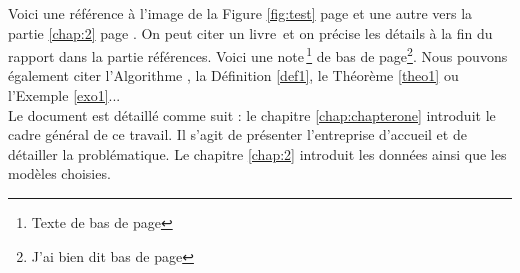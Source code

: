 


%
%


Voici une référence à l'image de la Figure \ref{fig:test} page \pageref{fig:test} et une autre vers la partie \ref{chap:2} page \pageref{chap:2}.
On peut citer un livre\, \cite{caillois1} et on précise les détails à la fin du rapport dans la partie références.
Voici une note\,\footnote{Texte de bas de page} de bas de page\footnote{J'ai bien dit bas de page}. Nous pouvons également citer l'Algorithme , la Définition \ref{def1}, le Théorème \ref{theo1} ou l'Exemple \ref{exo1}...\\

Le document est détaillé comme suit : le chapitre \ref{chap:chapterone} introduit le cadre général de ce travail. Il s'agit de présenter l'entreprise d'accueil et de détailler la problématique. Le chapitre \ref{chap:2} introduit les données ainsi que les modèles choisies. 


